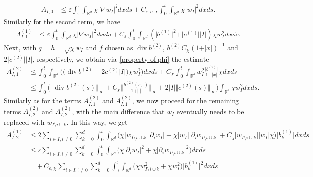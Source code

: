 \documentclass[a4paper,10pt]{article}
\newcommand\1{\mathbbm{1}}
\newcommand{\eps}{\varepsilon}
\DeclareMathOperator{\diverg}{div}
\numberwithin{equation}{section}
\begin{document}
\begin{align*}
A_{I,0} &  \leq\eps\int_{0}^{t}\int_{\mathbb{R}^{d}}\chi\vert \nabla
w_{I}\vert ^{2}dxds+C_{\eps,\sigma,\chi}\int_{0}^{t}\int 
_{\mathbb{R}^{d}}\chi\vert w_{I}\vert ^{2}dxds .
\end{align*}
Similarly for the second term, we have
\begin{align*}
A_{I,1}^{(1)  } 
&  \leq\eps\int_{0}^{t}\int_{\mathbb{R}^{d}}\chi\vert \nabla
w_{I}\vert ^{2}dxds+C_{\eps}\int_{0}^{t}\int_{\mathbb{R}^{d}}(
\vert b^{(1)  }\vert ^{2}+\vert c^{(
1)  }\vert \vert I\vert )  \chi w_{I}^{2}dxds .
\end{align*}
Next, with $g = h = \sqrt{\chi} w_I$ and $f$ chosen as $\diverg  b^{(2)  }$, $b^{(2)} C_\chi (1+ \vert x \vert)^{-1}$ and $2\vert c^{(2)  }\vert \vert I\vert$, respectively, we obtain via~\eqref{property of phi} the estimate 
\begin{align*}
A_{I,1}^{(2)} &  \leq \int_{0}^{t}\int_{\mathbb{R}^{d}} \big(  \big(\diverg  
b^{(2)}- 2c^{(2)  }\vert I\vert \big) \chi w_{I}^{2}\big) dxds +C_{\chi}\int_{0}^{t}\int_{\mathbb{R}^{d}}w_{I}^{2}\frac{\vert
b^{(2)}\vert }{1+\vert x\vert }\chi dxds\\
&  \leq\int_{0}^{t} \Big(\Vert \diverg b^{(2)}(s) \Vert _{\infty}+C_{\chi} \Big\Vert \frac{b^{(2)}(s,\cdot)}{1+\vert \cdot\vert } \Big\Vert_{\infty}
+ 2\vert I\vert \Vert c^{(2)}(s)  \Vert_{\infty}\Big) 
\int_{\mathbb{R}^{d}}\chi w_{I}^{2}dxds .
\end{align*}
Similarly as for the terms $A_{I,1}^{(2)}$ and $A_{I,1}^{(2)}$, we now proceed for the remaining terms $A_{I,2}^{(2)}$ and $A_{I,2}^{(2)}$, with the main difference that $w_I$ eventually needs to be replaced with $w_{I \setminus i \cup k}$. In this way, we get
\begin{align*}
A_{I,2}^{(1)} &  \leq 2 \sum_{i\in I,i\neq0} \sum_{k=0}^{d}\int_{0}^{t} \int_{\mathbb{R}^{d}} \big(\chi\vert w_{I\setminus i\cup k}\vert \vert \partial_{i}w_{I}\vert +\chi\vert w_{I}\vert \vert \partial_{i}w_{I\setminus i\cup k}\vert +C_{\chi}\vert w_{I\setminus i\cup k}\vert \vert w_{I}\vert \chi\big) \vert b_{k}^{(1)  }\vert dxds\\
&  \leq \eps \sum_{i\in I,i\neq0} \sum_{k=0}^{d}\int_{0}^{t} \int_{\mathbb{R}^{d}} \big(\chi\vert \partial_{i}w_{I}\vert^{2} + \chi\vert \partial_{i}w_{I\setminus i\cup k}\vert ^{2}\big) dxds\\
& \quad {}+ C_{\eps,\chi}\sum_{i\in I,i\neq0}\sum_{k=0}^{d}\int_{0}^{t} 
\int_{\mathbb{R}^{d}} \big(\chi w_{I\setminus i\cup k}^{2}+\chi w_{I} 
^{2}\big)  \vert b_{k}^{(1)  }\vert^{2} dxds
\end{align*}
\end{document}
